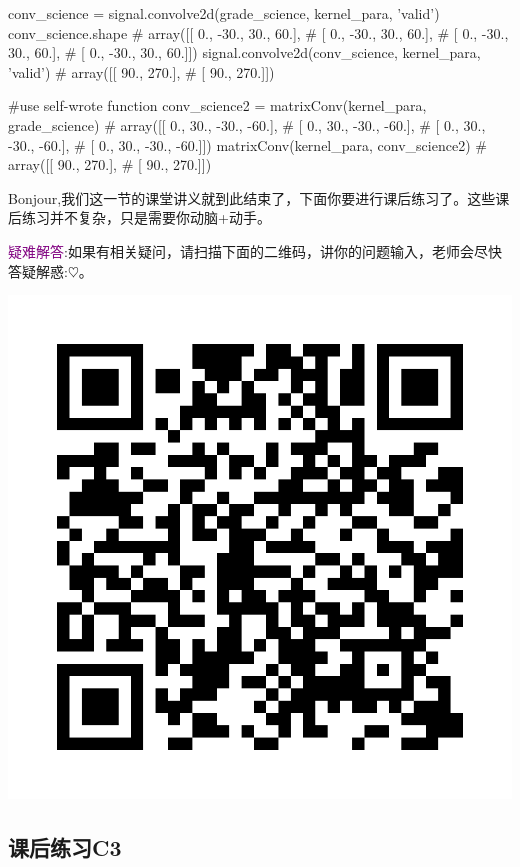 \documentclass[12pt]{article}
\numberwithin{figure}{section}
\numberwithin{equation}{section}
\begin{document}
\begin{python}
conv_science = signal.convolve2d(grade_science, kernel_para, 'valid')
conv_science.shape
# array([[  0., -30.,  30.,  60.],
#        [  0., -30.,  30.,  60.],
#        [  0., -30.,  30.,  60.],
#        [  0., -30.,  30.,  60.]])
signal.convolve2d(conv_science, kernel_para, 'valid')
# array([[ 90., 270.],
#        [ 90., 270.]])

#use self-wrote function
conv_science2 = matrixConv(kernel_para, grade_science)
# array([[  0.,  30., -30., -60.],
#        [  0.,  30., -30., -60.],
#        [  0.,  30., -30., -60.],
#        [  0.,  30., -30., -60.]])
matrixConv(kernel_para, conv_science2)
# array([[ 90., 270.],
#        [ 90., 270.]])
\end{python}


Bonjour,我们这一节的课堂讲义就到此结束了，下面你要进行课后练习了。这些课后练习并不复杂，只是需要你动脑+动手。

\hfil

\noindent
\textcolor{purple}{疑难解答}:如果有相关疑问，请扫描下面的二维码，讲你的问题输入，老师会尽快答疑解惑:$\heartsuit$。 \begin{marginfigure}
	\centering
	\includegraphics[width=\textwidth]{fig/C3C2qrcode}
\end{marginfigure}


\newpage
\subsection{课后练习C3}
\end{document}
